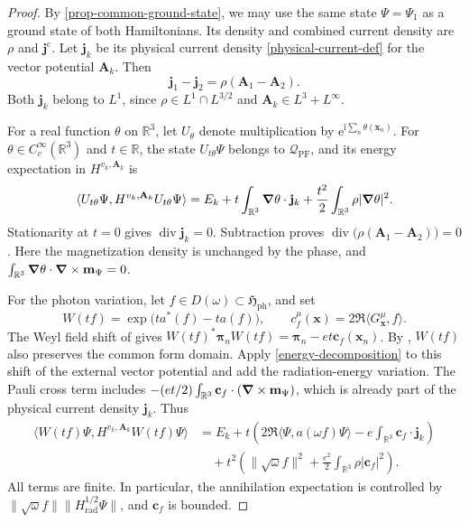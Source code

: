 \documentclass[final,reqno]{amsart}
\DeclareMathOperator{\div}{div}
\theoremstyle{remark}
\newcommand{\RR}{\mathbb{R}}
\renewcommand{\i}{\mathrm{i}}
\newcommand{\e}{\mathrm{e}}
\newcommand{\dua}[2]{\langle #1, #2 \rangle}
\newcommand{\DC}{D}
\newcommand{\vjc}{\mathbf{j}^{\mathrm{c}}}
\newcommand{\PF}{\mathrm{PF}}
\newcommand{\ph}{\mathrm{ph}}
\newcommand{\rad}{\mathrm{rad}}
\newcommand{\Hil}{\mathfrak{H}}
\newcommand{\vpi}{{\bm{\pi}}}
\newcommand{\vc}{\mathbf{c}}
\newcommand{\vm}{\mathbf{m}}
\newcommand{\vx}{\mathbf{x}}
\newcommand{\vj}{\mathbf{j}}
\newcommand{\vA}{{\mathbf{A}}}
\begin{document}
\begin{proof}
By \cref{prop-common-ground-state}, we may use the same state
$\Psi=\Psi_1$ as a ground state of both Hamiltonians.  Its density and
combined current density are $\rho$ and $\vjc$.  Let $\vj_k$ be its
physical current density \cref{physical-current-def} for the vector
potential $\vA_k$.  Then
\begin{equation*}
 \vj_1-\vj_2=\rho(\vA_1-\vA_2).
\end{equation*}
Both $\vj_k$ belong to $L^1$, since $\rho\in L^1\cap L^{3/2}$ and
$\vA_k\in L^3+L^\infty$.

For a real function $\theta$ on $\RR^3$, let $U_\theta$ denote
multiplication by $\e^{\i\sum_n\theta(\vx_n)}$.  For
$\theta\in C_c^\infty(\RR^3)$ and $t\in\RR$, the state
$U_{t\theta}\Psi$ belongs to $\mathcal Q_\PF$, and
its energy expectation in $H^{v_k,\vA_k}$ is
\[
 \dua{U_{t\theta}\Psi}{H^{v_k,\vA_k}U_{t\theta}\Psi}
 =E_k+t\int_{\RR^3}\grad\theta\cdot\vj_k
       +\frac{t^2}{2}\int_{\RR^3}\rho|\grad\theta|^2.
\]
Stationarity at $t=0$ gives $\div\vj_k=0$.  Subtraction proves
$\div\big(\rho(\vA_1-\vA_2)\big)=0$.
Here the magnetization density is unchanged by the phase, and
$\int_{\RR^3}\grad\theta\cdot\grad\times\vm_\Psi=0$.

For the photon variation, let $f\in \DC(\omega)\subset\Hil_\ph$, and set
\[
 W(tf)=\exp\big(t a^*(f)-t a(f)\big),\qquad
 c_f^\mu(\vx)=2\Re\dua{G^\mu_\vx}{f}.
\]
The Weyl field shift of \cite[Proposition~A.6(iii)]{Q} gives
$W(tf)^*\vpi_n W(tf)=\vpi_n-et\vc_f(\vx_n)$.  By
\cite[Corollary~A.8]{Q}, $W(tf)$ also preserves the common form
domain.  Apply \cref{energy-decomposition} to this shift
of the external vector potential and add the radiation-energy
variation.  The Pauli cross term includes
$-(et/2)\int_{\RR^3}\vc_f\cdot(\grad\times\vm_\Psi)$, which is already
part of the physical current density $\vj_k$.  Thus
\begin{equation}\label{weyl-energy-polynomial}
 \begin{split}
 \dua{W(tf)\Psi}{H^{v_k,\vA_k} W(tf)\Psi}
 &=E_k+t\left(2\Re\dua{\Psi}{a(\omega f)\Psi}
                            -e\int_{\RR^3}\vc_f\cdot\vj_k\right)\\
 &\quad+t^2\left(\|\sqrt\omega f\|^2
                            +\frac{e^2}{2}\int_{\RR^3}\rho|\vc_f|^2\right).
 \end{split}
\end{equation}
All terms are finite.  In particular, the annihilation expectation is
controlled by $\|\sqrt\omega f\|\|H_\rad^{1/2}\Psi\|$, and
$\vc_f$ is bounded. 


\end{proof}
\end{document}
